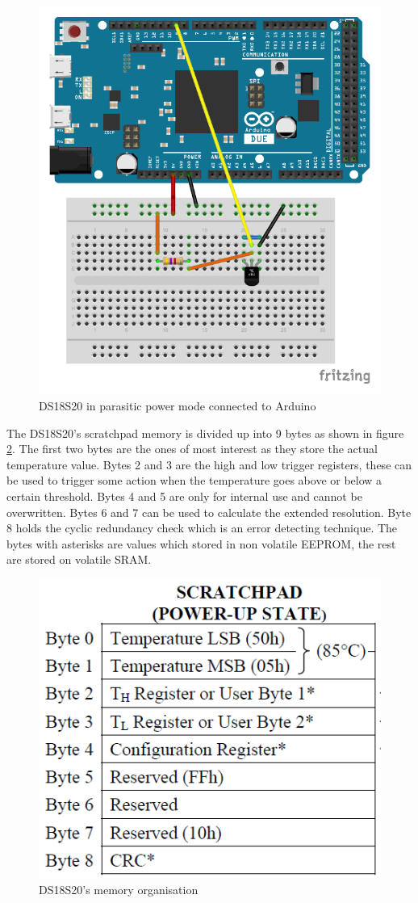 \begin{figure}[H]
	\centering
	\includegraphics[width=.5\linewidth]{Figures/TempSensor_bb.pdf}
	\caption{DS18S20 in parasitic power mode connected to Arduino}
	\label{fig:tempcircuit}
\end{figure}

The DS18S20's scratchpad memory is divided up into 9 bytes as shown in figure \ref{fig:dsmem}. The first two bytes are the ones of most interest as they store the actual temperature value. Bytes 2 and 3 are the high and low trigger registers, these can be used to trigger some action when the temperature goes above or below a certain threshold. Bytes 4 and 5 are only for internal use and cannot be overwritten. Bytes 6 and 7 can be used to calculate the extended resolution. Byte 8 holds the cyclic redundancy check which is an error detecting technique. The bytes with asterisks are values which stored in non volatile EEPROM, the rest are stored on volatile SRAM\cite{dsdatasheet}.

\begin{figure}[H]
	\centering
	\includegraphics[width=.6\linewidth]{Figures/dsmem.png}
	\caption{DS18S20's memory organisation}
	\label{fig:dsmem}
\end{figure}

